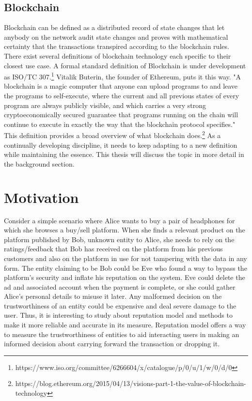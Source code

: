 \subsection{Blockchain}
Blockchain can be defined as a distributed record of state changes that let
anybody on the network audit state changes and proves with mathematical
certainty that the transactions transpired according to the blockchain rules.
There exist several definitions of blockchain technology each specific to their
closest use case. A formal standard definition of Blockchain is under
development as ISO/TC
307.\footnote{https://www.iso.org/committee/6266604/x/catalogue/p/0/u/1/w/0/d/0}
Vitalik Buterin, the founder of Ethereum, puts it this way.  "A blockchain is a
magic computer that anyone can upload programs to and leave the programs to
self-execute, where the current and all previous states of every program are
always publicly visible, and which carries a very strong cryptoeconomically
secured guarantee that programs running on the chain will continue to execute
in exactly the way that the blockchain protocol specifies."  This definition
provides a broad overview of what blockchain
does.\footnote{https://blog.ethereum.org/2015/04/13/visions-part-1-the-value-of-blockchain-technology}
As a continually developing discipline, it needs to keep adapting to a new
definition while maintaining the essence. This thesis will discuss the topic in
more detail in the background section.

 
\section{Motivation}
Consider a simple scenario where Alice wants to buy a pair of headphones for
which she browses a buy/sell platform. When she finds a relevant product on the
platform published by Bob, unknown entity to Alice, she needs to rely on the
ratings/feedback that Bob has received on the platform from his previous
customers and also on the platform in use for not tampering with the data in
any form.  The entity claiming to be Bob could be Eve who found a way to bypass
the platform's security and inflate his reputation on the system. Eve could
delete the ad and associated account when the payment is complete, or she could
gather Alice’s personal details to misuse it later. Any malformed decision on
the trustworthiness of an entity could be expensive and deal severe damage to
the user. Thus, it is interesting to study about reputation model and methods
to make it more reliable and accurate in its measure. Reputation model offers a
way to measure the trustworthiness of entities to aid interacting users in
making an informed decision about carrying forward the transaction or dropping
it. 

